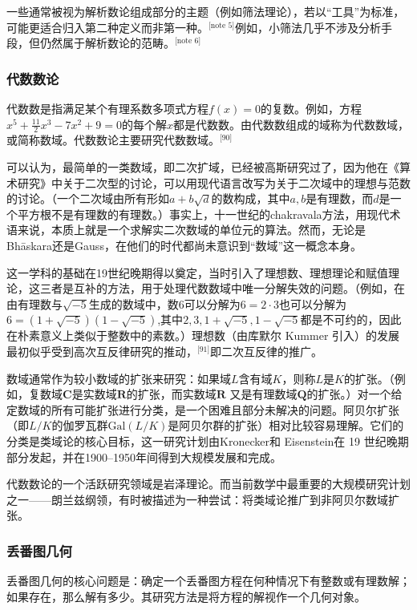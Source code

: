 一些通常被视为解析数论组成部分的主题（例如筛法理论），若以“工具”为标准，可能更适合归入第二种定义而非第一种。\(^\text{[note 5]}\)例如，小筛法几乎不涉及分析手段，但仍然属于解析数论的范畴。\(^\text{[note 6]}\)
\subsubsection{代数数论}
代数数是指满足某个有理系数多项式方程$f(x)=0$的复数。例如，方程$x^{5}+\tfrac{11}{2}x^{3}-7x^{2}+9=0$的每个解$x$都是代数数。由代数数组成的域称为代数数域，或简称数域。代数数论主要研究代数数域。\(^\text{[90]}\)

可以认为，最简单的一类数域，即二次扩域，已经被高斯研究过了，因为他在《算术研究》中关于二次型的讨论，可以用现代语言改写为关于二次域中的理想与范数的讨论。（一个二次域由所有形如$a+b\sqrt{d}$的数构成，其中$a, b$是有理数，而$d$是一个平方根不是有理数的有理数。）事实上，十一世纪的chakravala方法，用现代术语来说，本质上就是一个求解实二次数域的单位元的算法。然而，无论是Bhāskara还是Gauss，在他们的时代都尚未意识到“数域”这一概念本身。

这一学科的基础在19世纪晚期得以奠定，当时引入了理想数、理想理论和赋值理论，这三者是互补的方法，用于处理代数数域中唯一分解失效的问题。（例如，在由有理数与$\sqrt{-5}$生成的数域中，数$6$可以分解为$6 = 2 \cdot 3$也可以分解为$6 = (1+\sqrt{-5})(1-\sqrt{-5})$,其中$2, 3, 1+\sqrt{-5}, 1-\sqrt{-5}$都是不可约的，因此在朴素意义上类似于整数中的素数。）理想数（由库默尔 Kummer 引入）的发展最初似乎受到高次互反律研究的推动，\(^\text{[91]}\)即二次互反律的推广。

数域通常作为较小数域的扩张来研究：如果域$L$含有域$K$，则称$L$是$K$的扩张。（例如，复数域$\mathbf{C}$是实数域$\mathbf{R}$的扩张，而实数域$\mathbf{R}$ 又是有理数域$\mathbf{Q}$的扩张。）对一个给定数域的所有可能扩张进行分类，是一个困难且部分未解决的问题。阿贝尔扩张（即$L/K$的伽罗瓦群$\mathrm{Gal}(L/K)$是阿贝尔群的扩张）相对比较容易理解。它们的分类是类域论的核心目标，这一研究计划由Kronecker和 Eisenstein在 19 世纪晚期部分发起，并在1900–1950年间得到大规模发展和完成。

代数数论的一个活跃研究领域是岩泽理论。而当前数学中最重要的大规模研究计划之一——朗兰兹纲领，有时被描述为一种尝试：将类域论推广到非阿贝尔数域扩张。
\subsubsection{丢番图几何}
丢番图几何的核心问题是：确定一个丢番图方程在何种情况下有整数或有理数解；如果存在，那么解有多少。其研究方法是将方程的解视作一个几何对象。

